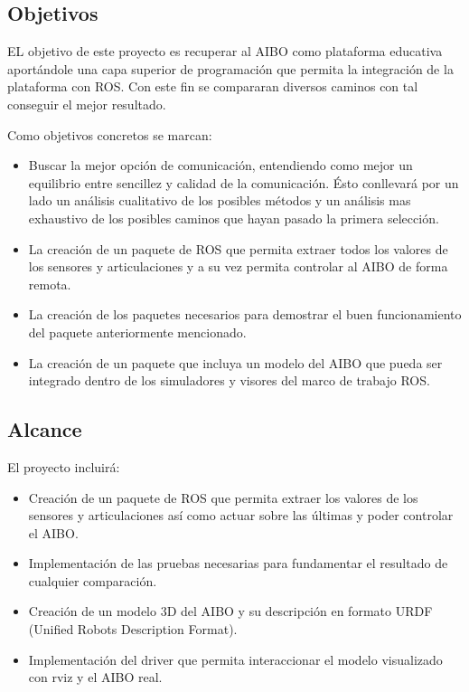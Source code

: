 \documentclass[12pt,a4paper,final,twoside]{book}
\begin{document}
\subsection{Objetivos}
EL objetivo de este proyecto es recuperar al AIBO como plataforma educativa aportándole una capa superior de programación que permita la integración de la plataforma con ROS.
Con este fin  se compararan diversos caminos con tal conseguir el mejor resultado.

Como objetivos concretos se marcan:
\begin{itemize}
\item Buscar la mejor opción de comunicación, entendiendo como mejor un equilibrio entre sencillez y calidad de la comunicación. Ésto conllevará por un lado  un análisis cualitativo de los posibles métodos y un análisis mas exhaustivo de los posibles caminos que hayan pasado la primera selección.

\item La creación de un paquete de ROS que permita extraer todos los valores de los sensores y articulaciones y a su vez permita controlar al AIBO de forma remota.

\item La creación de los paquetes necesarios para demostrar el buen funcionamiento del paquete anteriormente mencionado.

\item La creación de un paquete que incluya un modelo del AIBO que pueda ser integrado dentro de los simuladores y visores del marco de trabajo ROS. 
\end{itemize}

\subsection{Alcance}
El proyecto incluirá:
\begin{itemize}
\item Creación de un paquete de ROS que permita extraer los valores de los sensores y articulaciones así como actuar sobre las últimas y poder controlar el AIBO.
\item Implementación de las pruebas necesarias para fundamentar el resultado de cualquier comparación.
\item Creación de un modelo 3D del AIBO y su descripción en formato URDF (Unified Robots Description Format).
\item Implementación del driver que permita interaccionar el modelo visualizado con rviz y el AIBO real.
\end{itemize} 
\end{document}
